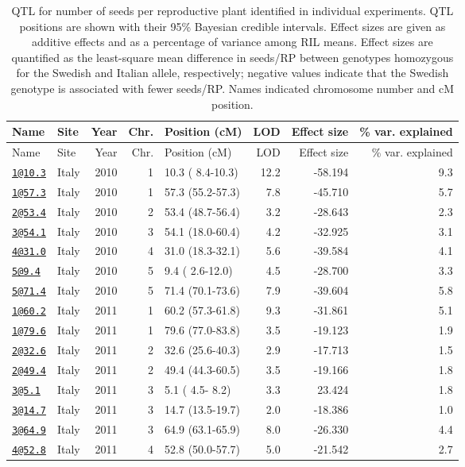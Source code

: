 \documentclass[]{article}
\begin{document}
\begin{longtable}[]{@{}llrrlrrr@{}}
\caption{\label{tab:individual-tofu-qtl}QTL for number of seeds per reproductive plant identified in individual experiments. QTL positions are shown with their 95\% Bayesian credible intervals. Effect sizes are given as additive effects and as a percentage of variance among RIL means. Effect sizes are quantified as the least-square mean difference in seeds/RP between genotypes homozygous for the Swedish and Italian allele, respectively; negative values indicate that the Swedish genotype is associated with fewer seeds/RP. Names indicated chromosome number and cM position.}\tabularnewline
\toprule
Name & Site & Year & Chr. & Position (cM) & LOD & Effect size & \% var. explained\tabularnewline
\midrule
\endfirsthead
\toprule
Name & Site & Year & Chr. & Position (cM) & LOD & Effect size & \% var. explained\tabularnewline
\midrule
\endhead
\href{mailto:1@10.3}{\nolinkurl{1@10.3}} & Italy & 2010 & 1 & 10.3 ( 8.4-10.3) & 12.2 & -58.194 & 9.3\tabularnewline
\href{mailto:1@57.3}{\nolinkurl{1@57.3}} & Italy & 2010 & 1 & 57.3 (55.2-57.3) & 7.8 & -45.710 & 5.7\tabularnewline
\href{mailto:2@53.4}{\nolinkurl{2@53.4}} & Italy & 2010 & 2 & 53.4 (48.7-56.4) & 3.2 & -28.643 & 2.3\tabularnewline
\href{mailto:3@54.1}{\nolinkurl{3@54.1}} & Italy & 2010 & 3 & 54.1 (18.0-60.4) & 4.2 & -32.925 & 3.1\tabularnewline
\href{mailto:4@31.0}{\nolinkurl{4@31.0}} & Italy & 2010 & 4 & 31.0 (18.3-32.1) & 5.6 & -39.584 & 4.1\tabularnewline
\href{mailto:5@9.4}{\nolinkurl{5@9.4}} & Italy & 2010 & 5 & 9.4 ( 2.6-12.0) & 4.5 & -28.700 & 3.3\tabularnewline
\href{mailto:5@71.4}{\nolinkurl{5@71.4}} & Italy & 2010 & 5 & 71.4 (70.1-73.6) & 7.9 & -39.604 & 5.8\tabularnewline
\href{mailto:1@60.2}{\nolinkurl{1@60.2}} & Italy & 2011 & 1 & 60.2 (57.3-61.8) & 9.3 & -31.861 & 5.1\tabularnewline
\href{mailto:1@79.6}{\nolinkurl{1@79.6}} & Italy & 2011 & 1 & 79.6 (77.0-83.8) & 3.5 & -19.123 & 1.9\tabularnewline
\href{mailto:2@32.6}{\nolinkurl{2@32.6}} & Italy & 2011 & 2 & 32.6 (25.6-40.3) & 2.9 & -17.713 & 1.5\tabularnewline
\href{mailto:2@49.4}{\nolinkurl{2@49.4}} & Italy & 2011 & 2 & 49.4 (44.3-60.5) & 3.5 & -19.166 & 1.8\tabularnewline
\href{mailto:3@5.1}{\nolinkurl{3@5.1}} & Italy & 2011 & 3 & 5.1 ( 4.5- 8.2) & 3.3 & 23.424 & 1.8\tabularnewline
\href{mailto:3@14.7}{\nolinkurl{3@14.7}} & Italy & 2011 & 3 & 14.7 (13.5-19.7) & 2.0 & -18.386 & 1.0\tabularnewline
\href{mailto:3@64.9}{\nolinkurl{3@64.9}} & Italy & 2011 & 3 & 64.9 (63.1-65.9) & 8.0 & -26.330 & 4.4\tabularnewline
\href{mailto:4@52.8}{\nolinkurl{4@52.8}} & Italy & 2011 & 4 & 52.8 (50.0-57.7) & 5.0 & -21.542 & 2.7\tabularnewline

\end{longtable}
\end{document}
